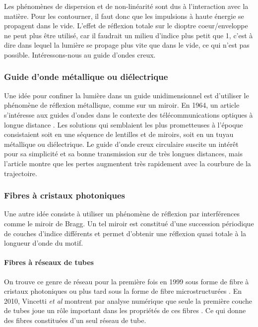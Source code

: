 Les phénomènes de dispersion et de non-linéarité sont dus à l'interaction avec la matière. Pour les contourner, il faut donc que les impulsions à haute énergie se propagent dans le vide. L'effet de réflexion totale sur le dioptre coeur/enveloppe ne peut plus être utilisé, car il faudrait un milieu d'indice plus petit que 1, c'est à dire dans lequel la lumière se propage plus vite que dans le vide, ce qui n'est pas possible. Intéressons-nous au guide d'ondes creux.

\subsubsection{Guide d'onde métallique ou diélectrique}

Une idée pour confiner la lumière dans un guide unidimensionnel est d'utiliser le phénomène de réflexion métallique, comme sur un miroir. En 1964, un article s'intéresse aux guides d'ondes dans le contexte des télécommunications optiques à longue distance \cite{marcatili_hollow_1964}. Les solutions qui semblaient les plus prometteuses à l'époque consistaient soit en une séquence de lentilles et de miroirs, soit en un tuyau métallique ou diélectrique. Le guide d'onde creux circulaire suscite un intérêt pour sa simplicité et sa bonne transmission sur de très longues distances, mais l'article montre que les pertes augmentent très rapidement avec la courbure de la trajectoire.

\subsubsection{Fibres à cristaux photoniques}

Une autre idée consiste à utiliser un phénomène de réflexion par interférences comme le miroir de Bragg. Un tel miroir est constitué d'une succession périodique de couches d'indice différents et permet d'obtenir une réflexion quasi totale à la longueur d'onde du motif. 

\paragraph{Fibres à réseaux de tubes}
On trouve ce genre de réseau pour la première fois en 1999 sous forme de fibre à cristaux photoniques \cite{cregan_single-mode_1999} ou plus tard sous la forme de fibre microstructurées \cite{argyros_hollow-core_2006}. En 2010, Vincetti \emph{et al} montrent par analyse numérique que seule la première couche de tubes joue un rôle important dans les propriétés de ces fibres \cite{vincetti_waveguiding_2010}. Ce qui donne des fibres constituées d'un seul réseau de tube.

